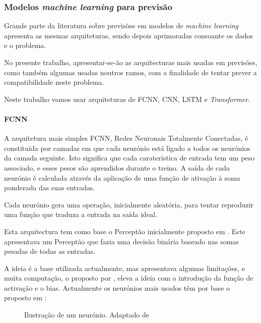 \subsubsection{Modelos \textit{machine learning} para previsão\label{se:arquiteturas_modelos}}

Grande parte da literatura sobre previsões em modelos de \textit{machine learning} apresenta as mesmas arquiteturas, sendo depois aprimoradas consoante os dados e o problema.\par
No presente trabalho, apresentar-se-ão as arquitecturas mais usadas em previsões, como também algumas usadas noutros ramos, com a finalidade de tentar prever a compatibilidade neste problema.\par
Neste trabalho vamos usar arquiteturas de \gls{FCNN}, \gls{CNN}, \gls{LSTM} e \textit{Transformer}.\par




\paragraph{FCNN\label{se:fcnn_sec}}
\text{ }  \par

A arquitetura mais simples \gls{FCNN}, Redes Neuronais Totalmente Conectadas, é constituída por camadas em que cada neurónio está ligado a todos os neurónios da camada seguinte. Isto significa que cada caraterística de entrada tem um peso associado, e esses pesos são aprendidos durante o treino. A saída de cada neurónio é calculada através da aplicação de uma função de ativação à soma ponderada das suas entradas.\par
Cada neurónio gera uma operação, inicialmente aleatória, para tentar reproduzir uma função que traduza a entrada na saída ideal.\par
Esta arquitectura tem como base o Perceptão inicialmente proposto em \cite{Rosenblatt1958}. Este apresentava um Perceptão que fazia uma decisão binária baseado nas somas pesadas de todas as entradas.\par
A ideia é a base utilizada actualmente, mas apresentava algumas limitações, e muita computação, o proposto por \cite{Minsky1969}, eleva a ideia com a introdução da função de activação e o bias. Actualmente os neurónios mais usados têm por base o proposto em \cite{Haykin1999}:


\begin{figure}[H]
	\centering
	\resizebox{0.7\linewidth}{!}{}
	\caption{Ilustração de um neurónio. Adaptado de \cite{Haykin1999}}
	\label{fig:neuronio}
\end{figure}



